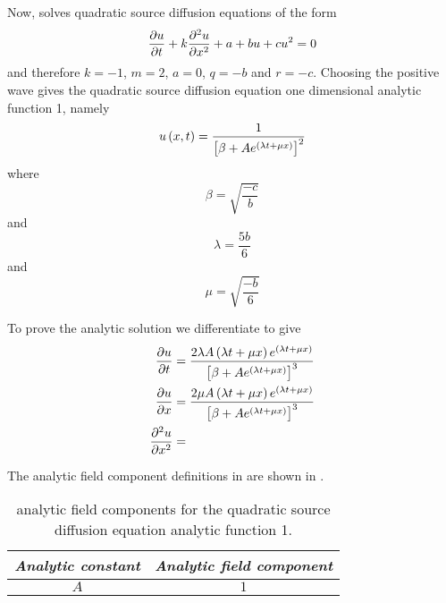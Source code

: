 Now, \OpenCMISS solves quadratic source diffusion equations of the form
\begin{equation}
  \delby{u}{t}+k\deltwosqby{u}{x}+a+bu+cu^{2}=0
  \label{eqn:OpenCMISSQuadraticSourceDiffusionEquationOneDim}
\end{equation}
and therefore $k=-1$, $m=2$, $a=0$, $q=-b$ and $r=-c$. Choosing the positive wave gives the
\OpenCMISS quadratic source diffusion equation one dimensional analytic function 1, namely
\begin{equation}
  \fnof{u}{x,t}=\dfrac{1}{\sqbrac{\beta+Ae^{\pbrac{\lambda t + \mu x}}}^{2}}
  \label{eqn:AnalyticQuadraticSourceDiffusionEquationOneDim1}
\end{equation}
where
\begin{equation}
  \beta=\sqrt{\dfrac{-c}{b}}
\end{equation}
and
\begin{equation}
  \lambda=\dfrac{5b}{6}
\end{equation}
and 
\begin{equation}
  \mu=\sqrt{\dfrac{-b}{6}}
\end{equation}

To prove the analytic solution we differentiate
 to give 
\begin{align}
  \delby{u}{t} &= \dfrac{2\lambda A\pbrac{\lambda t+\mu x}e^{\pbrac{\lambda t+\mu
        x}}}{\sqbrac{\beta+Ae^{\pbrac{\lambda t + \mu x}}}^{3}} \\
  \delby{u}{x} &= \dfrac{2\mu A\pbrac{\lambda t+\mu x}e^{\pbrac{\lambda t+\mu
        x}}}{\sqbrac{\beta+Ae^{\pbrac{\lambda t + \mu x}}}^{3}} \\
  \deltwosqby{u}{x} &=
  \label{eqn:AnalyticDiffusionEquationOneDim1Derivatives}
\end{align}

The analytic field component definitions in \OpenCMISS are shown in .

\begin{table}[htb] \centering
  \begin{tabular}{|c|c|} \hline
    \emph{Analytic constant} & \emph{Analytic field component} \\ \hline \hline
    $A$ & $1$ \\ \hline
  \end{tabular}
  \caption{\OpenCMISS analytic field components for the \oned quadratic
    source diffusion equation analytic function 1.}
  \label{tab:OpenCMISSAnalyticFieldQuadraticSoureDiffusionEquationOneDim1}
\end{table}

